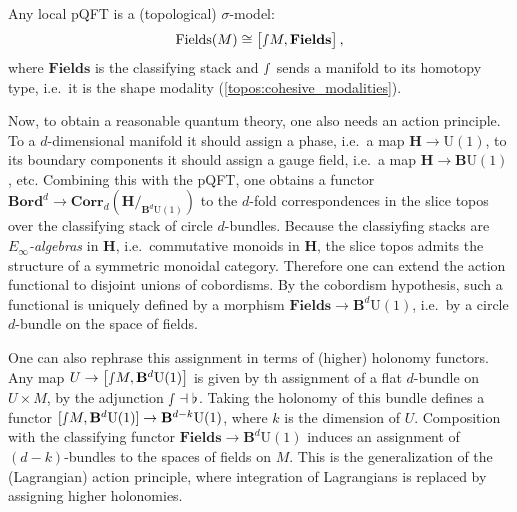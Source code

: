     \begin{property}
        Any local pQFT is a (topological) $\sigma$-model:
        \begin{gather}
            \mathrm{Fields}(M)\cong\bigl[\smallint\!M,\mathbf{Fields}\bigr]\,,
        \end{gather}
        where $\mathbf{Fields}$ is the classifying stack and $\smallint$ sends a manifold to its homotopy type, i.e.~it is the shape modality (\cref{topos:cohesive_modalities}).
    \end{property}

    Now, to obtain a reasonable quantum theory, one also needs an action principle. To a $d$-dimensional manifold it should assign a phase, i.e.~a map $\mathbf{H}\rightarrow\mathrm{U}(1)$, to its boundary components it should assign a gauge field, i.e.~a map $\mathbf{H}\rightarrow\mathbf{B}\mathrm{U}(1)$, etc. Combining this with the pQFT, one obtains a functor $\mathbf{Bord}^d\rightarrow\mathbf{Corr}_d(\mathbf{H}/_{\mathbf{B}^d\mathrm{U}(1)})$ to the $d$-fold correspondences in the slice topos over the classifying stack of circle $d$-bundles. Because the classiyfing stacks are \textit{$E_\infty$-algebras} in $\mathbf{H}$, i.e.~commutative monoids in $\mathbf{H}$, the slice topos admits the structure of a symmetric monoidal category. Therefore one can extend the action functional to disjoint unions of cobordisms.
    By the cobordism hypothesis, such a functional is uniquely defined by a morphism $\mathbf{Fields}\rightarrow\mathbf{B}^d\mathrm{U}(1)$, i.e.~by a circle $d$-bundle on the space of fields.

    One can also rephrase this assignment in terms of (higher) holonomy functors. Any map $U\rightarrow\bigl[\smallint\!M,\mathbf{B}^d\mathrm{U}(1)\bigr]$ is given by th assignment of a flat $d$-bundle on $U\times M$, by the adjunction $\smallint\dashv\flat$. Taking the holonomy of this bundle defines a functor $[\smallint\!M,\mathbf{B}^d\mathrm{U}(1)]\rightarrow\mathbf{B}^{d-k}\mathrm{U}(1)$, where $k$ is the dimension of $U$. Composition with the classifying functor $\mathbf{Fields}\rightarrow\mathbf{B}^d\mathrm{U}(1)$ induces an assignment of $(d-k)$-bundles to the spaces of fields on $M$. This is the generalization of the (Lagrangian) action principle, where integration of Lagrangians is replaced by assigning higher holonomies.
